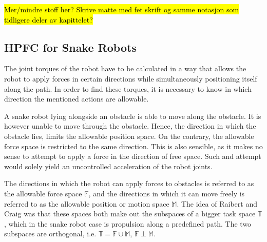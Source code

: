 \hl{Mer/mindre stoff her? Skrive matte med fet skrift og samme notasjon som tidligere deler av kapittelet?}

\subsection{HPFC for Snake Robots}\label{subseq:snakeHPFC}


The joint torques of the robot have to be calculated in a way that allows the robot to apply forces in certain directions while simultaneously positioning itself along the path. In order to find these torques, it is necessary to know in which direction the mentioned actions are allowable.

A snake robot lying alongside an obstacle is able to move along the obstacle. It is however unable to move through the obstacle. Hence, the direction in which the obstacle lies, limits the allowable position space. On the contrary, the allowable force space is restricted to the same direction. 
This is also sensible, as it makes no sense to attempt to apply a force in the direction of free space. Such and attempt would solely yield an uncontrolled acceleration of the robot joints.




The directions in which the robot can apply forces to obstacles is referred to as the allowable force space $\mathbb{F}$, and the directions in which it can move freely is referred to as the allowable position or motion space $\mathbb{M}$. The idea of Raibert and Craig \cite{raibert1981hybrid} was that these spaces both make out the subspaces of a bigger task space $\mathbb{T}$, which in the snake robot case is propulsion along a predefined path. The two subspaces are orthogonal, i.e. $\mathbb{T}=\mathbb{F}\cup\mathbb{M}$, $\mathbb{F}\perp\mathbb{M}$.

